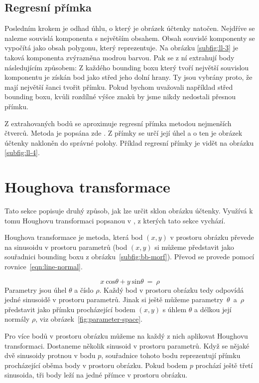 \documentclass[thesis=B,czech]{FITthesis}[2019/12/23]
\begin{document}
\newpage
\subsection{Regresní přímka}
Posledním krokem je odhad úhlu, o který je obrázek účtenky natočen. Nejdříve se nalezne souvislá komponenta s největším obsahem. Obsah souvislé komponenty se vypočítá jako obsah polygonu, který reprezentuje. Na obrázku \ref{subfig:ll-3} je taková komponenta zvýrazněna modrou barvou. Pak se z ní extrahují body následujícím způsobem: Z každého bounding boxu který tvoří největší souvislou komponentu je získán bod jako střed jeho dolní hrany. Ty jsou vybrány proto, že mají největší šanci tvořit přímku. Pokud bychom uvažovali například střed bounding boxu, kvůli rozdílné výšce znaků by jsme nikdy nedostali přesnou přímku.

Z extrahovaných bodů se aproximuje regresní přímka metodou nejmenších čtverců. Metoda je popsána zde  \cite{novakLinearniRegrese2019}. Z přímky se určí její úhel a o ten je obrázek účtenky nakloněn do správné polohy. Příklad regresní přímky je vidět na obrázku \ref{subfig:ll-4}.


\newpage %
\section{Houghova transformace}
\label{sec:hough-transform}
Tato sekce popisuje druhý způsob, jak lze určit sklon obrázku účtenky. Využívá k tomu Houghovu transformaci popsanou v  \cite{Duda1972, likforman-sulemHoughBasedAlgorithm1995}, z kterých tato sekce vychází.

Houghova transformace je metoda, která bod $(x,y)$ v prostoru obrázku převede na sinusoidu v prostoru parametrů (bod $(x,y)$ si můžeme představit jako souřadnici bounding boxu z obrázku~\ref{subfig:bb-morf}). Převod se provede pomocí rovnice~\ref{eqn:line-normal}.

\begin{equation}
	\label{eqn:line-normal}
	x\ \mathrm{cos}\theta + y\ \mathrm{sin}\theta\ =\ \rho
\end{equation}
Parametry jsou úhel $\theta$ a číslo $\rho$. Každý bod v prostoru obrázku tedy odpovídá jedné sinusoidě v prostoru parametrů. Jinak si ještě můžeme parametry~$\theta$~a~$\rho$ představit jako přímku procházející bodem $(x,y)$ s úhlem $\theta$ a délkou její normály $\rho$, viz obrázek~\ref{fig:parameter-space}.

Pro více bodů v prostoru obrázku můžeme na každý z nich aplikovat Houghovu transformaci. Dostaneme několik sinusoid v prostoru parametrů. Když se nějaké dvě sinusoidy protnou v bodu $p$, souřadnice tohoto bodu reprezentují přímku procházející oběma body v prostoru obrázku. Pokud bodem $p$ prochází ještě třetí sinusoida, tři body leží na jedné přímce v prostoru obrázku.
\end{document}

